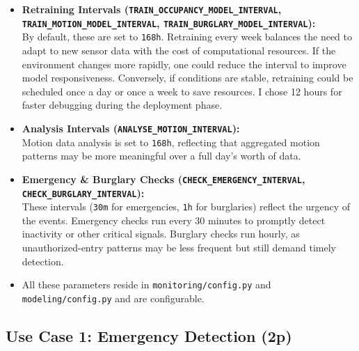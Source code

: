 \documentclass[A4,10pt]{article}
\begin{document}
\begin{itemize}
    \item \textbf{Retraining Intervals (\texttt{TRAIN\_OCCUPANCY\_MODEL\_INTERVAL}, \texttt{TRAIN\_MOTION\_MODEL\_INTERVAL}, \texttt{TRAIN\_BURGLARY\_MODEL\_INTERVAL}):}\\
    By default, these are set to \texttt{168h}. Retraining every week balances the need to adapt to new sensor data with the cost of computational resources. If the environment changes more rapidly, one could reduce the interval to improve model responsiveness. Conversely, if conditions are stable, retraining could be scheduled once a day or once a week to save resources. I chose 12 hours for faster debugging during the deployment phase.

    \item \textbf{Analysis Intervals (\texttt{ANALYSE\_MOTION\_INTERVAL}):}\\
    Motion data analysis is set to \texttt{168h}, reflecting that aggregated motion patterns may be more meaningful over a full day’s worth of data.

    \item \textbf{Emergency \& Burglary Checks (\texttt{CHECK\_EMERGENCY\_INTERVAL}, \texttt{CHECK\_BURGLARY\_INTERVAL}):}\\
    These intervals (\texttt{30m} for emergencies, \texttt{1h} for burglaries) reflect the urgency of the events. Emergency checks run every 30 minutes to promptly detect inactivity or other critical signals. Burglary checks run hourly, as unauthorized-entry patterns may be less frequent but still demand timely detection.

    \item All these parameters reside in \texttt{monitoring/config.py} and \texttt{modeling/config.py} and are configurable.
\end{itemize}


\subsection{Use Case 1: Emergency Detection (2p)}
\label{sec:use_case_emergency_detection}
\end{document}
